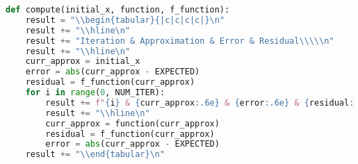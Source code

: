 \documentclass{article}
\begin{document}
\begin{enumerate}[label=\alph*.)]
\begin{lstlisting}[language=Python]
def compute(initial_x, function, f_function):
    result = "\\begin{tabular}{|c|c|c|c|}\n"
    result += "\\hline\n"
    result += "Iteration & Approximation & Error & Residual\\\\\n"
    result += "\\hline\n"
    curr_approx = initial_x
    error = abs(curr_approx - EXPECTED)
    residual = f_function(curr_approx)
    for i in range(0, NUM_ITER):
        result += f"{i} & {curr_approx:.6e} & {error:.6e} & {residual:.6e}\\\\\n"
        result += "\\hline\n"
        curr_approx = function(curr_approx)
        residual = f_function(curr_approx)
        error = abs(curr_approx - EXPECTED)
    result += "\\end{tabular}\n"


\end{lstlisting}
\end{enumerate}
\end{document}
